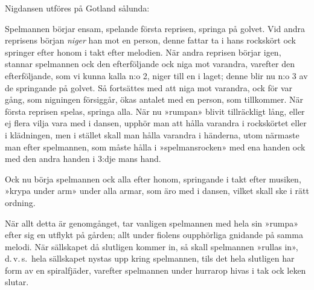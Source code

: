 {
\vspace{0.7cm}
Nigdansen utföres på Gotland sålunda:\medskip{}

Spelmannen börjar ensam, spelande första reprisen, springa på golvet.
Vid andra reprisens början \textit{niger} han mot en person, denne
fattar ta i hans rockskört ock springer efter honom i takt efter melodien.
När andra reprisen börjar igen, stannar spelmannen ock den efterföljande
ock niga mot varandra, varefter den efterföljande, som vi kunna kalla
n:o 2, niger till en i laget; denne blir nu n:o 3 av de springande
på golvet. Så fortsättes med att niga mot varandra, ock för var gång,
som nigningen försiggår, ökas antalet med en person, som tillkommer.
När första reprisen spelas, springa alla. När nu »rumpan» blivit tillräckligt
lång, eller ej flera vilja vara med i dansen, upphör man att hålla
varandra i rockskörtet eller i klädningen, men i stället skall man
hålla varandra i händerna, utom närmaste man efter spelmannen, som
måste hålla i »spelmansrocken» med ena handen ock med den andra handen
i 3:dje mans hand.

\setlength{\parindent}{1.5em}
Ock nu börja spelmannen ock alla efter honom, springande i takt efter
musiken, »krypa under arm» under alla armar, som äro med i dansen,
vilket skall ske i rätt ordning.

När allt detta är genomgånget, tar vanligen spelmannen med hela sin
»rumpa» efter sig en utflykt på gården; allt under fiolens oupphörliga
gnidande på samma melodi. När sällskapet då slutligen kommer in, så
skall spelmannen »rullas in», d.\,v.\,s.\ hela sällskapet nystas
upp kring spelmannen, tils det hela slutligen har form av en spiralfjäder,
varefter spelmannen under hurrarop hivas i tak ock leken slutar.
\vspace{0.3cm}
}
